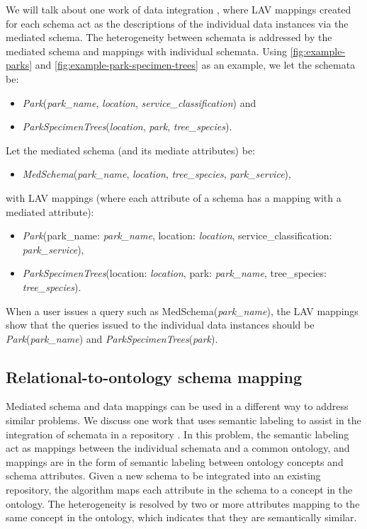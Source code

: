 We will talk about one work of data integration \cite{Levy1996Querying}, where LAV mappings created for each schema act as the descriptions of the individual data instances via the mediated schema. The heterogeneity between schemata is addressed by the mediated schema and mappings with individual schemata. Using \autoref{fig:example-parks} and \autoref{fig:example-park-specimen-trees} as an example, we let the schemata be:
\begin{itemize}
	\item[] \textit{Park}(\textit{park\_name}, \textit{location}, \textit{service\_classification}) and
	\item[] \textit{ParkSpecimenTrees}(\textit{location}, \textit{park}, \textit{tree\_species}).
\end{itemize}
Let the mediated schema (and its mediate attributes) be:
\begin{itemize}
	\item[] \textit{MedSchema}(\textit{park\_name}, \textit{location}, \textit{tree\_species}, \textit{park\_service}),
\end{itemize}
with LAV mappings (where each attribute of a schema has a mapping with a mediated attribute):
\begin{itemize}
	\item[] \textit{Park}(park\_name: \textit{park\_name}, location: \textit{location}, service\_classification: \textit{park\_service}),
	\item[] \textit{ParkSpecimenTrees}(location: \textit{location}, park: \textit{park\_name}, tree\_species: \textit{tree\_species}).
\end{itemize}
When a user issues a query such as MedSchema(\textit{park\_name}), the LAV mappings show that the queries issued to the individual data instances should be \textit{Park}(\textit{park\_name}) and \textit{ParkSpecimenTrees}(\textit{park}).

\subsection{Relational-to-ontology schema mapping}

Mediated schema and data mappings can be used in a different way to address similar problems. We discuss one work that uses semantic labeling to assist in the integration of schemata in a repository \cite{Diego2018Machine}. In this problem, the semantic labeling act as mappings between the individual schemata and a common ontology, and mappings are in the form of semantic labeling between ontology concepts and schema attributes. Given a new schema to be integrated into an existing repository, the algorithm maps each attribute in the schema to a concept in the ontology. The heterogeneity is resolved by two or more attributes mapping to the same concept in the ontology, which indicates that they are semantically similar.

